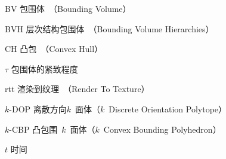 \begin{denotation}

\item[BV] 包围体~（Bounding Volume）
\item[BVH] 层次结构包围体~（Bounding Volume Hierarchies）
\item[CH] 凸包~（Convex Hull）
\item[$\tau$] 包围体的紧致程度 
\item[rtt] 渲染到纹理~（Render To Texture）
\item[$k$-DOP] 离散方向$k$~面体（$k$~Discrete Orientation Polytope）
\item[$k$-CBP] 凸包围~$k$~面体（$k$~Convex Bounding Polyhedron）
\item[$t$] 时间
\end{denotation}
